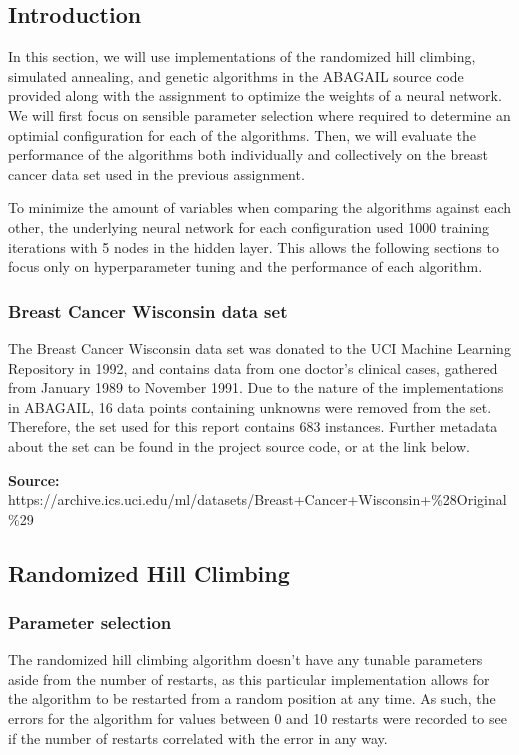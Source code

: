 \documentclass{article}
\begin{document}
    \subsection{Introduction}
      In this section, we will use implementations of the randomized hill climbing, simulated annealing, and genetic algorithms in the ABAGAIL source code provided along with the assignment to optimize the weights of a neural network. We will first focus on sensible parameter selection where required to determine an optimial configuration for each of the algorithms. Then, we will evaluate the performance of the algorithms both individually and collectively on the breast cancer data set used in the previous assignment.

      To minimize the amount of variables when comparing the algorithms against each other, the underlying neural network for each configuration used 1000 training iterations with 5 nodes in the hidden layer. This allows the following sections to focus only on hyperparameter tuning and the performance of each algorithm.

      \subsubsection{Breast Cancer Wisconsin data set}
        The Breast Cancer Wisconsin data set was donated to the UCI Machine Learning Repository in 1992, and contains data from one doctor's clinical cases, gathered from January 1989 to November 1991. Due to the nature of the implementations in ABAGAIL, 16 data points containing unknowns were removed from the set. Therefore, the set used for this report contains 683 instances. Further metadata about the set can be found in the project source code, or at the link below.

        \textbf{Source:} https://archive.ics.uci.edu/ml/datasets/Breast+Cancer+Wisconsin+\%28Original\%29

    \subsection{Randomized Hill Climbing}

      \subsubsection{Parameter selection}
        The randomized hill climbing algorithm doesn't have any tunable parameters aside from the number of restarts, as this particular implementation allows for the algorithm to be restarted from a random position at any time. As such, the errors for the algorithm for values between 0 and 10 restarts were recorded to see if the number of restarts correlated with the error in any way.
\end{document}
